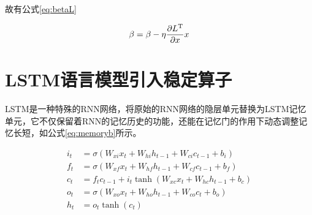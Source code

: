 故有公式\ref{eq:betaL}

\begin{equation}
	\label{eq:betaL}
   	\beta  = \beta  - \eta \frac{{\partial {L^{\rm T}}}}{{\partial x}}x
\end{equation} 

\section{LSTM语言模型引入稳定算子}  

LSTM是一种特殊的RNN网络，将原始的RNN网络的隐层单元替换为LSTM记忆单元，它不仅保留着RNN的记忆历史的功能，还能在记忆门的作用下动态调整记忆长短，如公式\ref{eq:memoryb}所示。

\begin{equation}\label{eq:memoryb}
\begin{split}
i_t &= \sigma (W_{xi}x_t+W_{hi}h_{t-1}+W_{ci}c_{t-1}+b_i) \\
f_t &= \sigma (W_{xf}x_t+W_{hf}h_{t-1}+W_{cf}c_{t-1}+b_f) \\
c_t &= f_{t}c_{t-1}+i_{t}\tanh(W_{xc}x_t+W_{hc}h_{t-1}+b_c) \\
o_t &= \sigma (W_{xo}x_{t}+W_{ho}h_{t-1}+W_{co}c_t+b_o) \\
h_t &= o_t \tanh(c_t)
\end{split}
\end{equation}

